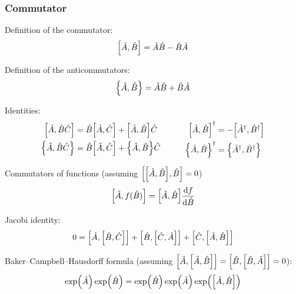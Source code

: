 		\subsubsection{Commutator}
			\noindent
			Definition of the commutator:
			\begin{equation}
				\comm{\hat{A}}{\hat{B}} = \hat{A}\hat{B} - \hat{B}\hat{A}
			\end{equation}

			\noindent
			Definition of the anticommutators:
			\begin{equation}
				\acomm{\hat{A}}{\hat{B}} = \hat{A}\hat{B} + \hat{B}\hat{A}
			\end{equation}

			\noindent
			Identities:
			\begin{equation}
				\begin{aligned}
					\comm{\hat{A}}{\hat{B}\hat{C}}
					&= \hat{B}\comm{\hat{A}}{\hat{C}} + \comm{\hat{A}}{\hat{B}}\hat{C} \\
					\acomm{\hat{A}}{\hat{B}\hat{C}}
					&= \hat{B}\comm{\hat{A}}{\hat{C}} + \acomm{\hat{A}}{\hat{B}}\hat{C} \\
				\end{aligned}
				\hsp
				\begin{aligned}
					\comm{\hat{A}}{\hat{B}}^\dagger &= -\comm{\hat{A}^\dagger}{\hat{B}^\dagger} \\
					\acomm{\hat{A}}{\hat{B}}^\dagger &= \acomm{\hat{A}^\dagger}{\hat{B}^\dagger} \\
				\end{aligned}
			\end{equation}

			\noindent
			Commutators of functions (assuming $\comm{\comm{\hat{A}}{\hat{B}}}{\hat{B}}=0$)
			\begin{equation}
				\comm{\hat{A}}{f(\hat{B})}
				= \comm{\hat{A}}{\hat{B}}\dv{f}{\hat{B}}(\hat{B}) \\
			\end{equation}

			\noindent
			Jacobi identity:
			\begin{equation}
				0 = \comm{\hat{A}}{\comm{\hat{B}}{\hat{C}}} + \comm{\hat{B}}{\comm{\hat{C}}{\hat{A}}} + \comm{\hat{C}}{\comm{\hat{A}}{\hat{B}}}
			\end{equation}


			\noindent
			Baker--Campbell--Hausdorff formula (assuming $\comm{\hat{A}}{\comm{\hat{A}}{\hat{B}}} = \comm{\hat{B}}{\comm{\hat{B}}{\hat{A}}} = 0$):
			\begin{equation}
				\exp(\hat{A})\exp(\hat{B}) = \exp(\hat{B}) \exp(\hat{A}) \exp(\comm{\hat{A}}{\hat{B}})
			\end{equation}

